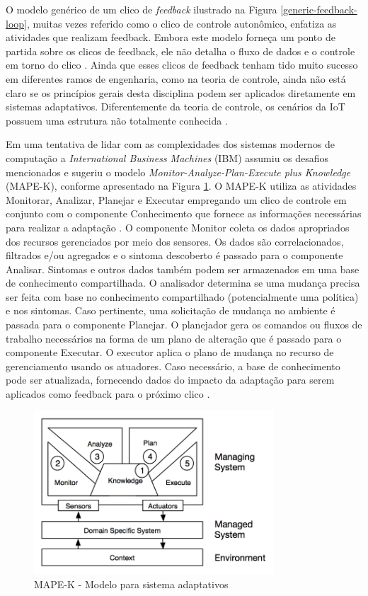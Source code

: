 \documentclass[tid,table]{texufpel} %
\begin{document}
O modelo genérico de um clico de \textit{feedback} ilustrado na Figura \ref{generic-feedback-loop}, muitas vezes referido como o clico de controle autonômico, enfatiza as atividades que realizam feedback. Embora este modelo forneça um ponto de partida sobre os clicos de feedback, ele não detalha o fluxo de dados e o controle em torno do clico \cite{dobson06}. Ainda que esses clicos de feedback tenham tido muito sucesso em diferentes ramos de engenharia, como na teoria de controle, ainda não está claro se os princípios gerais desta disciplina podem ser aplicados diretamente em sistemas adaptativos. Diferentemente da teoria de controle, os cenários da IoT possuem uma estrutura não totalmente conhecida \cite{lamprecht12}.


Em uma tentativa de lidar com as complexidades dos sistemas modernos de computação a \textit{International Business Machines} (IBM) assumiu os desafios mencionados e sugeriu o modelo \textit{Monitor-Analyze-Plan-Execute plus Knowledge} (MAPE-K), conforme apresentado na Figura \ref{mape-k-model}. O MAPE-K utiliza as atividades Monitorar, Analizar, Planejar e Executar empregando um clico de controle em conjunto com o componente Conhecimento que fornece as informações necessárias para realizar a adaptação \cite{aman15}. O componente Monitor coleta os dados apropriados dos recursos gerenciados por meio dos sensores. Os dados são correlacionados, filtrados e/ou agregados e o sintoma descoberto é passado para o componente Analisar. Sintomas e outros dados também podem ser armazenados em uma base de conhecimento compartilhada. O analisador determina se uma mudança precisa ser feita com base no conhecimento compartilhado (potencialmente uma política) e nos sintomas. Caso pertinente, uma solicitação de mudança no ambiente é passada para o componente Planejar. O planejador gera os comandos ou fluxos de trabalho necessários na forma de um plano de alteração que é passado para o componente Executar. O executor aplica o plano de mudança no recurso de gerenciamento usando os atuadores. Caso necessário, a base de conhecimento pode ser atualizada, fornecendo dados do impacto da adaptação para serem aplicados como feedback para o próximo clico \cite{lamprecht12}.

\begin{figure}[ht]
\centering
\includegraphics[width=0.8\textwidth]{imagens/mape-k-model.png}
\caption{MAPE-K - Modelo para sistema adaptativos \cite{iglesia15}}
\label{mape-k-model}
\end{figure}
\end{document}
